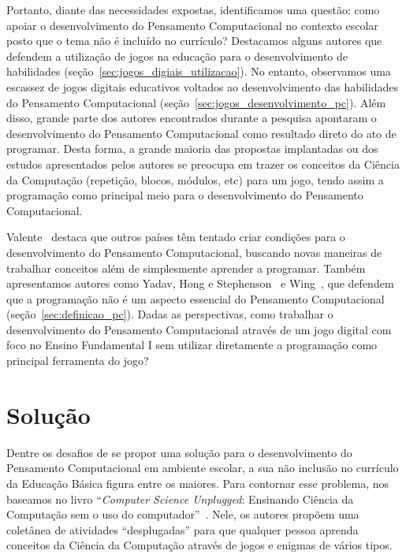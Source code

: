 Portanto, diante das necessidades expostas, identificamos uma questão: como apoiar o desenvolvimento do Pensamento Computacional no contexto escolar posto que o tema não é incluído no currículo? Destacamos alguns autores que defendem a utilização de jogos na educação para o desenvolvimento de habilidades (seção~\ref{sec:jogos_digiais_utilizacao}). No entanto, observamos uma escassez de jogos digitais educativos voltados ao desenvolvimento das habilidades do Pensamento Computacional (seção~\ref{sec:jogos_desenvolvimento_pc}). Além disso, grande parte dos autores encontrados durante a pesquisa apontaram o desenvolvimento do Pensamento Computacional como resultado direto do ato de programar. Desta forma, a grande maioria das propostas implantadas ou dos estudos apresentados pelos autores se preocupa em trazer os conceitos da Ciência da Computação (repetição, blocos, módulos, etc) para um jogo, tendo assim a programação como principal meio para o desenvolvimento do Pensamento Computacional.

Valente~\cite{valente_integracao_2016} destaca que outros países têm tentado criar condições para o desenvolvimento do Pensamento Computacional, buscando novas maneiras de trabalhar conceitos além de simplesmente aprender a programar. Também apresentamos autores como Yadav, Hong e Stephenson~\cite{yadav_computational_2016} e Wing~\cite{wing_computational_2006}, que defendem que a programação não é um aspecto essencial do Pensamento Computacional (seção~\ref{sec:definicao_pc}). Dadas as perspectivas, como trabalhar o desenvolvimento do Pensamento Computacional através de um jogo digital com foco no Ensino Fundamental I sem utilizar diretamente a programação como principal ferramenta do jogo?

\section{Solução} \label{sec:solucao}

Dentre os desafios de se propor uma solução para o desenvolvimento do Pensamento Computacional em ambiente escolar, a sua não inclusão no currículo da Educação Básica figura entre os maiores. Para contornar esse problema, nos baseamos no livro “\textit{Computer Science Unplugged}: Ensinando Ciência da Computação sem o uso do computador”~\cite{bell_computer_2011}. Nele, os autores propõem uma coletânea de atividades “desplugadas” para que qualquer pessoa aprenda conceitos da Ciência da Computação através de jogos e enigmas de vários tipos.

